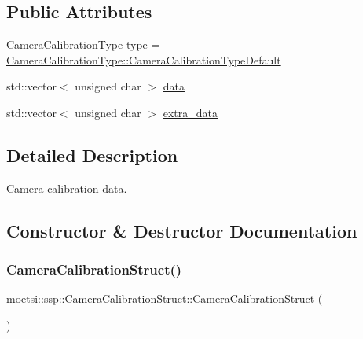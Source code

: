 \subsection*{Public Attributes}
\begin{DoxyCompactItemize}
\item 
\hyperlink{namespacemoetsi_1_1ssp_a1f51291db51233dc5865d42e6ee36ef8}{Camera\+Calibration\+Type} \hyperlink{structmoetsi_1_1ssp_1_1CameraCalibrationStruct_adcb025ea2cc5b2f30574318300f7b284}{type} = \hyperlink{namespacemoetsi_1_1ssp_a1f51291db51233dc5865d42e6ee36ef8ac32f0bb1b309dd3992d8e37bfaa00c78}{Camera\+Calibration\+Type\+::\+Camera\+Calibration\+Type\+Default}
\item 
std\+::vector$<$ unsigned char $>$ \hyperlink{structmoetsi_1_1ssp_1_1CameraCalibrationStruct_a8d3384afc77d7b9b5c2ce0c5cea52420}{data}
\item 
std\+::vector$<$ unsigned char $>$ \hyperlink{structmoetsi_1_1ssp_1_1CameraCalibrationStruct_acf795c6f1fabdd1e825d562d25a2dc73}{extra\+\_\+data}
\end{DoxyCompactItemize}


\subsection{Detailed Description}
Camera calibration data. 

\subsection{Constructor \& Destructor Documentation}
\mbox{\label{structmoetsi_1_1ssp_1_1CameraCalibrationStruct_a5571f80a7f6136c795fde444eef1d015}} 
\subsubsection{\texorpdfstring{Camera\+Calibration\+Struct()}{CameraCalibrationStruct()}\hspace{0.1cm}{\footnotesize\ttfamily [1/4]}}
{\footnotesize\ttfamily moetsi\+::ssp\+::\+Camera\+Calibration\+Struct\+::\+Camera\+Calibration\+Struct (\begin{DoxyParamCaption}{ }\end{DoxyParamCaption})\hspace{0.3cm}{\ttfamily [inline]}}

